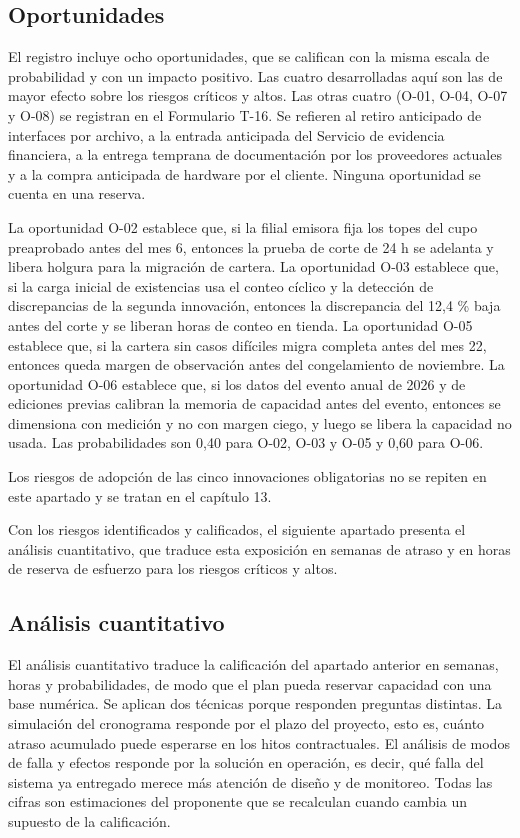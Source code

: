 \documentclass[11pt]{article}
\begin{document}
\subsection{Oportunidades}

El registro incluye ocho oportunidades, que se califican con la misma escala de probabilidad y con un impacto positivo. Las cuatro desarrolladas aquí son las de mayor efecto sobre los riesgos críticos y altos. Las otras cuatro (O-01, O-04, O-07 y O-08) se registran en el Formulario T-16. Se refieren al retiro anticipado de interfaces por archivo, a la entrada anticipada del Servicio de evidencia financiera, a la entrega temprana de documentación por los proveedores actuales y a la compra anticipada de hardware por el cliente. Ninguna oportunidad se cuenta en una reserva.

La oportunidad O-02 establece que, si la filial emisora fija los topes del cupo preaprobado antes del mes 6, entonces la prueba de corte de 24 h se adelanta y libera holgura para la migración de cartera. La oportunidad O-03 establece que, si la carga inicial de existencias usa el conteo cíclico y la detección de discrepancias de la segunda innovación, entonces la discrepancia del 12,4 \% baja antes del corte y se liberan horas de conteo en tienda. La oportunidad O-05 establece que, si la cartera sin casos difíciles migra completa antes del mes 22, entonces queda margen de observación antes del congelamiento de noviembre. La oportunidad O-06 establece que, si los datos del evento anual de 2026 y de ediciones previas calibran la memoria de capacidad antes del evento, entonces se dimensiona con medición y no con margen ciego, y luego se libera la capacidad no usada. Las probabilidades son 0,40 para O-02, O-03 y O-05 y 0,60 para O-06.

Los riesgos de adopción de las cinco innovaciones obligatorias no se repiten en este apartado y se tratan en el capítulo 13.

Con los riesgos identificados y calificados, el siguiente apartado presenta el análisis cuantitativo, que traduce esta exposición en semanas de atraso y en horas de reserva de esfuerzo para los riesgos críticos y altos.

\subsection{Análisis cuantitativo}

El análisis cuantitativo traduce la calificación del apartado anterior en semanas, horas y probabilidades, de modo que el plan pueda reservar capacidad con una base numérica. Se aplican dos técnicas porque responden preguntas distintas. La simulación del cronograma responde por el plazo del proyecto, esto es, cuánto atraso acumulado puede esperarse en los hitos contractuales. El análisis de modos de falla y efectos responde por la solución en operación, es decir, qué falla del sistema ya entregado merece más atención de diseño y de monitoreo. Todas las cifras son estimaciones del proponente que se recalculan cuando cambia un supuesto de la calificación.
\end{document}
